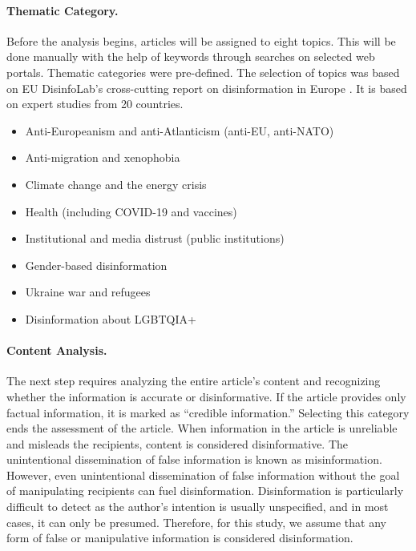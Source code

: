 \documentclass[11pt]{article}
\begin{document}
\paragraph{Thematic Category.}

Before the analysis begins, articles will be assigned to eight topics. This will be done manually with the help of keywords through searches on selected web portals. Thematic categories were pre-defined. The selection of topics was based on EU DisinfoLab's cross-cutting report on disinformation in Europe \cite{sessa2023connecting}. It is based on expert studies from 20 countries. 

\begin{itemize}[nosep, leftmargin=*]
    \item Anti-Europeanism and anti-Atlanticism (anti-EU, anti-NATO)
    \item Anti-migration and xenophobia
    \item Climate change and the energy crisis 
    \item Health (including COVID-19 and vaccines)
    \item Institutional and media distrust (public institutions)
    \item Gender-based disinformation
    \item Ukraine war and refugees 
    \item Disinformation about LGBTQIA+
\end{itemize}

\paragraph{Content Analysis.} 

The next step requires analyzing the entire article's content and recognizing whether the information is accurate or disinformative. If the article provides only factual information, it is marked as “credible information.” Selecting this category ends the assessment of the article. When information in the article is unreliable and misleads the recipients, content is considered disinformative. The unintentional dissemination of false information is known as misinformation. However, even unintentional dissemination of false information without the goal of manipulating recipients can fuel disinformation. Disinformation is particularly difficult to detect as the author’s intention is usually unspecified, and in most cases, it can only be presumed. Therefore, for this study, we assume that any form of false or manipulative information is considered disinformation.
\end{document}
